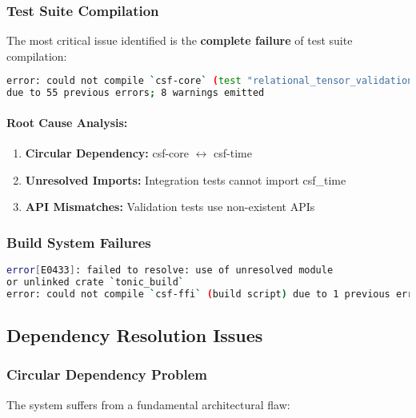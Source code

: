 \documentclass[11pt,a4paper]{article}
\newcommand{\critical}[1]{\textcolor{criticalred}{\textbf{#1}}}
\begin{document}
\subsubsection{Test Suite Compilation}
The most critical issue identified is the \critical{complete failure} of test suite compilation:

\begin{lstlisting}[language=bash, frame=single, caption=csf-core Test Compilation Error]
error: could not compile `csf-core` (test "relational_tensor_validation") 
due to 55 previous errors; 8 warnings emitted
\end{lstlisting}

\paragraph{Root Cause Analysis:}
\begin{enumerate}
    \item \textbf{Circular Dependency:} csf-core $\leftrightarrow$ csf-time
    \item \textbf{Unresolved Imports:} Integration tests cannot import csf\_time
    \item \textbf{API Mismatches:} Validation tests use non-existent APIs
\end{enumerate}

\subsubsection{Build System Failures}
\begin{lstlisting}[language=bash, frame=single, caption=Build System Error]
error[E0433]: failed to resolve: use of unresolved module 
or unlinked crate `tonic_build`
error: could not compile `csf-ffi` (build script) due to 1 previous error
\end{lstlisting}

\subsection{Dependency Resolution Issues}

\subsubsection{Circular Dependency Problem}
The system suffers from a fundamental architectural flaw:

\begin{center}
\end{center}
\end{document}
